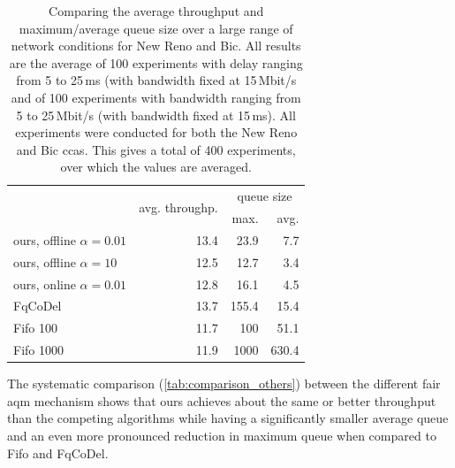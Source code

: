 \documentclass[conference]{IEEEtran}
\begin{document}
\begin{table}
\caption{Comparing the average throughput and maximum/average queue size over a large range of network conditions for New Reno and Bic. All results are the average of 100 experiments with delay ranging from 5 to 25\,ms (with bandwidth fixed at 15\,Mbit/s and of 100 experiments with bandwidth ranging from 5 to 25\,Mbit/s (with bandwidth fixed at 15\,ms). All experiments were conducted for both the New Reno and Bic \glspl{cca}. This gives a total of 400 experiments, over which the values are averaged.} \label{tab:comparison_others}
\centering
\begin{tabular}{l r r r} \toprule
& \multirow{2}{*}{avg. throughp.} & \multicolumn{2}{c}{queue size} \\
& & max. & avg. \\ \midrule
\gls{ours}, offline $\alpha=0.01$ & 13.4 & 23.9 & 7.7\\
\gls{ours}, offline $\alpha=10$ & 12.5 & 12.7 & 3.4\\
\gls{ours}, online $\alpha=0.01$ & 12.8 & 16.1 & 4.5\\
FqCoDel	& 13.7 & 155.4 & 15.4\\
Fifo 100	& 11.7 & 100 & 51.1\\
Fifo 1000	& 11.9 & 1000 & 630.4 \\
\bottomrule
\end{tabular}
\end{table}

The systematic comparison (\autoref{tab:comparison_others}) between the different fair \gls{aqm} mechanism shows that \gls{ours} achieves about the same or better throughput than the competing algorithms while having a significantly smaller average queue and an even more pronounced reduction in maximum queue when compared to Fifo and FqCoDel.  
\end{document}
